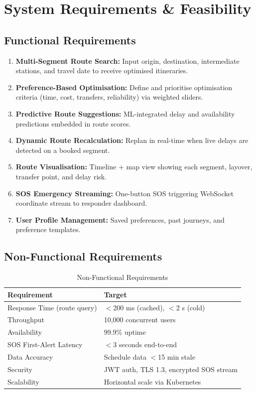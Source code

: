 \documentclass[12pt,a4paper]{report}
\begin{document}
\chapter{System Requirements \& Feasibility}

\section{Functional Requirements}

\begin{enumerate}[leftmargin=1.5em]
  \item \textbf{Multi-Segment Route Search:} Input origin, destination, intermediate stations, and travel date to receive optimised itineraries.
  \item \textbf{Preference-Based Optimisation:} Define and prioritise optimisation criteria (time, cost, transfers, reliability) via weighted sliders.
  \item \textbf{Predictive Route Suggestions:} ML-integrated delay and availability predictions embedded in route scores.
  \item \textbf{Dynamic Route Recalculation:} Replan in real-time when live delays are detected on a booked segment.
  \item \textbf{Route Visualisation:} Timeline + map view showing each segment, layover, transfer point, and delay risk.
  \item \textbf{SOS Emergency Streaming:} One-button SOS triggering WebSocket coordinate stream to responder dashboard.
  \item \textbf{User Profile Management:} Saved preferences, past journeys, and preference templates.
\end{enumerate}

\section{Non-Functional Requirements}

\begin{table}[h!]
\centering
\caption{Non-Functional Requirements}
\begin{tabularx}{\textwidth}{lX}
\toprule
\textbf{Requirement} & \textbf{Target} \\
\midrule
Response Time (route query) & $<$200 ms (cached), $<$2 s (cold) \\
Throughput & 10,000 concurrent users \\
Availability & 99.9\% uptime \\
SOS First-Alert Latency & $<$3 seconds end-to-end \\
Data Accuracy & Schedule data $<$15 min stale \\
Security & JWT auth, TLS 1.3, encrypted SOS stream \\
Scalability & Horizontal scale via Kubernetes \\
\bottomrule
\end{tabularx}
\end{table}
\end{document}
